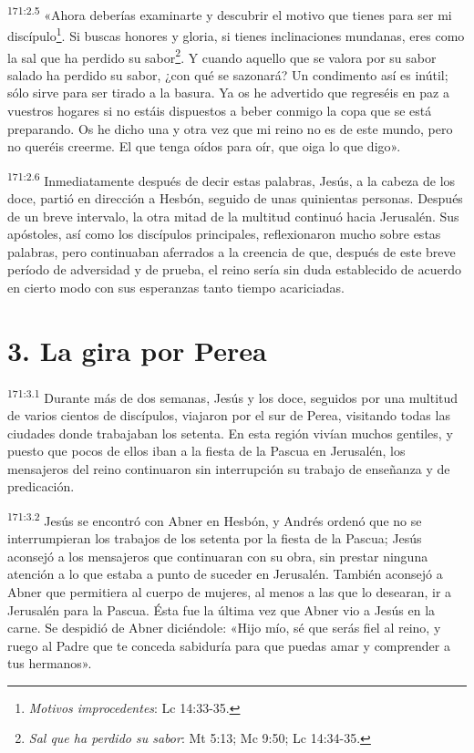 \par
\textsuperscript{171:2.5} «Ahora deberías examinarte y descubrir el motivo que tienes para ser mi discípulo\footnote{\textit{Motivos improcedentes}: Lc 14:33-35.}. Si buscas honores y gloria, si tienes inclinaciones mundanas, eres como la sal que ha perdido su sabor\footnote{\textit{Sal que ha perdido su sabor}: Mt 5:13; Mc 9:50; Lc 14:34-35.}. Y cuando aquello que se valora por su sabor salado ha perdido su sabor, ¿con qué se sazonará? Un condimento así es inútil; sólo sirve para ser tirado a la basura. Ya os he advertido que regreséis en paz a vuestros hogares si no estáis dispuestos a beber conmigo la copa que se está preparando. Os he dicho una y otra vez que mi reino no es de este mundo, pero no queréis creerme. El que tenga oídos para oír, que oiga lo que digo».

\par
\textsuperscript{171:2.6} Inmediatamente después de decir estas palabras, Jesús, a la cabeza de los doce, partió en dirección a Hesbón, seguido de unas quinientas personas. Después de un breve intervalo, la otra mitad de la multitud continuó hacia Jerusalén. Sus apóstoles, así como los discípulos principales, reflexionaron mucho sobre estas palabras, pero continuaban aferrados a la creencia de que, después de este breve período de adversidad y de prueba, el reino sería sin duda establecido de acuerdo en cierto modo con sus esperanzas tanto tiempo acariciadas.

\section*{3. La gira por Perea}
\par
\textsuperscript{171:3.1} Durante más de dos semanas, Jesús y los doce, seguidos por una multitud de varios cientos de discípulos, viajaron por el sur de Perea, visitando todas las ciudades donde trabajaban los setenta. En esta región vivían muchos gentiles, y puesto que pocos de ellos iban a la fiesta de la Pascua en Jerusalén, los mensajeros del reino continuaron sin interrupción su trabajo de enseñanza y de predicación.

\par
\textsuperscript{171:3.2} Jesús se encontró con Abner en Hesbón, y Andrés ordenó que no se interrumpieran los trabajos de los setenta por la fiesta de la Pascua; Jesús aconsejó a los mensajeros que continuaran con su obra, sin prestar ninguna atención a lo que estaba a punto de suceder en Jerusalén. También aconsejó a Abner que permitiera al cuerpo de mujeres, al menos a las que lo desearan, ir a Jerusalén para la Pascua. Ésta fue la última vez que Abner vio a Jesús en la carne. Se despidió de Abner diciéndole: «Hijo mío, sé que serás fiel al reino, y ruego al Padre que te conceda sabiduría para que puedas amar y comprender a tus hermanos».

